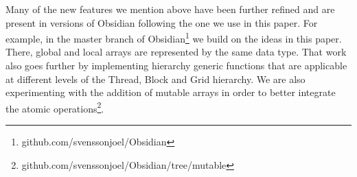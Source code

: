 Many of the new features we mention above have been further refined and 
are present in versions of Obsidian following the one we use in this paper. For 
example, in the master branch of Obsidian\footnote{github.com/svenssonjoel/Obsidian} we build on the ideas in this paper. 
There, global and local arrays are represented by the same data type. That 
work also goes further by implementing hierarchy generic functions that are 
applicable at different levels of the Thread, Block and Grid hierarchy. 
We are also experimenting with the addition of mutable arrays in order to 
better integrate the atomic operations\footnote{github.com/svenssonjoel/Obsidian/tree/mutable}. 





  
